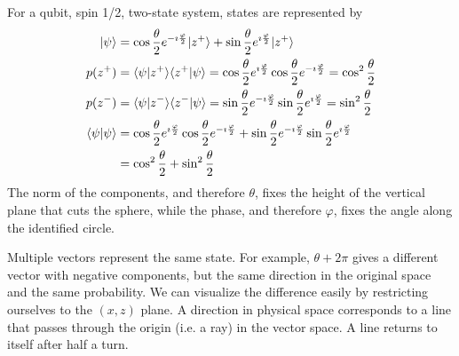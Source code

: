 \documentclass{article}
\begin{document}
For a qubit, spin 1/2, two-state system, states are represented by
\begin{equation}
	\begin{aligned}
		| \psi \rangle &= \cos \frac{\theta}{2} e^{-\imath \frac{\varphi}{2}} | z^+ \rangle + \sin \frac{\theta}{2} e^{\imath \frac{\varphi}{2}} | z^+ \rangle \\
		p(z^+) &= \langle\psi | z^+ \rangle \langle z^+ | \psi \rangle = \cos \frac{\theta}{2} e^{\imath \frac{\varphi}{2}} \cos \frac{\theta}{2} e^{-\imath \frac{\varphi}{2}} = \cos^2 \frac{\theta}{2} \\
	p(z^-) &= \langle\psi | z^- \rangle \langle z^- | \psi \rangle = \sin \frac{\theta}{2} e^{-\imath \frac{\varphi}{2}} \sin \frac{\theta}{2} e^{\imath \frac{\varphi}{2}} = \sin^2 \frac{\theta}{2} \\
		\langle \psi | \psi \rangle &= \cos \frac{\theta}{2} e^{\imath \frac{\varphi}{2}} \cos \frac{\theta}{2} e^{-\imath \frac{\varphi}{2}} + \sin \frac{\theta}{2} e^{-\imath \frac{\varphi}{2}} \sin \frac{\theta}{2} e^{\imath \frac{\varphi}{2}} \\
		&= \cos^2 \frac{\theta}{2} + \sin^2 \frac{\theta}{2} \\
	\end{aligned}
\end{equation}
The norm of the components, and therefore $\theta$, fixes the height of the vertical plane that cuts the sphere, while the phase, and therefore $\varphi$, fixes the angle along the identified circle.

Multiple vectors represent the same state. For example, $\theta + 2\pi$ gives a different vector with negative components, but the same direction in the original space and the same probability. We can visualize the difference easily by restricting ourselves to the $(x,z)$ plane. A direction in physical space corresponds to a line that passes through the origin (i.e. a ray) in the vector space. A line returns to itself after half a turn.
\end{document}
